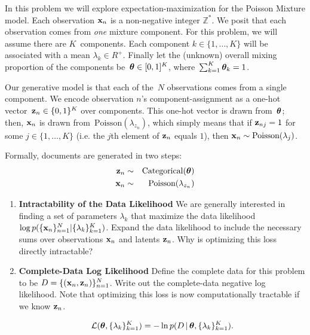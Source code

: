 \documentclass[submit]{harvardml}
\begin{document}
\begin{problem}

In this problem we will explore expectation-maximization for the
Poisson Mixture model.  Each observation $\mathbf{x}_n$ is a
non-negative integer $\mathbb{Z}^{*}$.  We posit that each
observation comes from \emph{one} mixture component.  For this
problem, we will assume there are $K$~components. Each component $k
\in \{1, \ldots, K\}$ will be associated with a mean $\lambda_k
\in R^{+}$.  Finally let the (unknown) overall mixing proportion of
the components be~$\boldsymbol{\theta} \in [0,1]^K$, where~${\sum_{k=1}^K
  \boldsymbol{\theta}_k=1}$.

Our generative model is that each of the~$N$ observations comes from a
single component.  We encode observation $n$'s component-assignment as
a one-hot vector~${\mathbf{z}_n \in \{0,1\}^K}$ over components. This
one-hot vector is drawn from~$\boldsymbol{\theta}$; then, $\mathbf{x}_n$ is drawn
from~$\text{Poisson}(\lambda_{z_n} )$, which simply means that if $\mathbf{z}_{nj} = 1$ for some $j \in \{1,\ldots, K\}$ (i.e. the $j$th element of $\mathbf{z}_n$ equals $1$), then $\mathbf{x}_n \sim \text{Poisson}(\lambda_j)$. 

Formally, documents are generated in two
steps:
\begin{eqnarray*}
 \mathbf{z}_n &\sim& \text{Categorical}(\boldsymbol{\theta}) \\
 \mathbf{x}_n &\sim& \text{Poisson}(\lambda_{z_n} )
\end{eqnarray*}

  \begin{enumerate}

  \item \textbf{Intractability of the Data Likelihood} We are
    generally interested in finding a set of parameters $\lambda_k$
    that maximize the data likelihood $\log p(\{\mathbf{x}_n\}^N_{n=1}|\{\lambda_k\}^K_{k = 1})$.
    Expand the data likelihood to include the necessary sums over
    observations $\mathbf{x}_n$ and latents $\mathbf{z}_n$.  Why is optimizing this loss
    directly intractable?
    
\item \textbf{Complete-Data Log Likelihood} Define the complete data for this problem to be $D = \{(\mathbf{x}_n, \mathbf{z}_n)\}_{n=1}^N$. Write out the complete-data negative log likelihood. Note that optimizing this loss is now computationally tractable if we know $\mathbf{z}_n$.

\[\mathcal{L}(\boldsymbol{\theta}, \{\lambda_k\}^K_{k=1}) =  -\ln p(D \,|\,\boldsymbol{\theta}, \{\lambda_k\}^K_{k=1}).\] 
    


\end{enumerate}
\end{problem}
\end{document}
